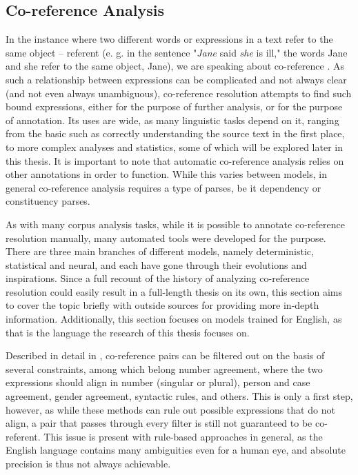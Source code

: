 \documentclass[a4paper, 11pt]{article}
\begin{document}
\subsection{Co-reference Analysis}
In the instance where two different words or expressions in a text refer to the same object -- referent (e. g. in the sentence "\textit{Jane} said \textit{she} is ill," the words Jane and she refer to the same object, Jane), we are speaking about co-reference \citep{dictionary}. As such a relationship between expressions can be complicated and not always clear (and not even always unambiguous), co-reference resolution attempts to find such bound expressions, either for the purpose of further analysis, or for the purpose of annotation. Its uses are wide, as many linguistic tasks depend on it, ranging from the basic such as correctly understanding the source text in the first place, to more complex analyses and statistics, some of which will be explored later in this thesis. It is important to note that automatic co-reference analysis relies on other annotations in order to function. While this varies between models, in general co-reference analysis requires a type of parses, be it dependency or constituency parses.

As with many corpus analysis tasks, while it is possible to annotate co-reference resolution manually, many automated tools were developed for the purpose. There are three main branches of different models, namely deterministic, statistical and neural, and each have gone through their evolutions and inspirations. Since a full recount of the history of analyzing co-reference resolution could easily result in a full-length thesis on its own, this section aims to cover the topic briefly with outside sources for providing more in-depth information. Additionally, this section focuses on models trained for English, as that is the language the research of this thesis focuses on.

Described in detail in \citet{jurafsky}, co-reference pairs can be filtered out on the basis of several constraints, among which belong number agreement, where the two expressions should align in number (singular or plural), person and case agreement, gender agreement, syntactic rules, and others. This is only a first step, however, as while these methods can rule out possible expressions that do not align, a pair that passes through every filter is still not guaranteed to be co-referent. This issue is present with rule-based approaches in general, as the English language contains many ambiguities even for a human eye, and absolute precision is thus not always achievable.
\end{document}
